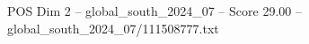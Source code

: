 \begin{textsample}{POS Dim 2 – global\_south\_2024\_07 – Score 29.00 – global\_south\_2024\_07/111508777.txt}
\end{textsample}
